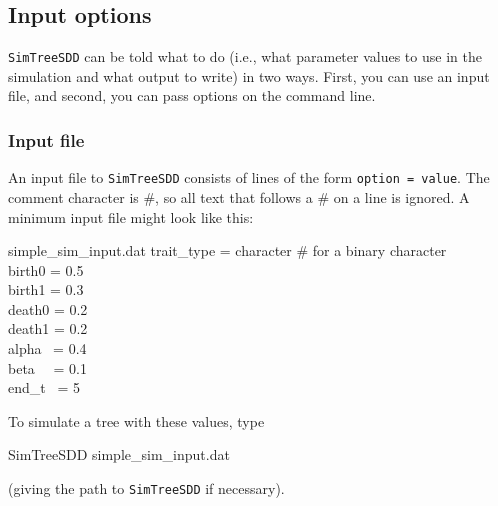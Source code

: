 \documentclass[10pt]{article}
\begin{document}
\subsection*{Input options}

\texttt{SimTreeSDD} can be told what to do (i.e., what parameter values to use in the simulation and what output to write) in two ways.
First, you can use an input file, and second, you can pass options on the command line.

\subsubsection*{Input file}

An input file to \texttt{SimTreeSDD} consists of lines of the form \texttt{option = value}.  The comment character is \#, so all text that follows a \# on a line is ignored.  A minimum input file might look like this:
\begin{filesays}{simple\_sim\_input.dat}
	trait\_type = character \# for a binary character \\
	birth0  = 0.5  \\
	birth1  = 0.3  \\
	death0  = 0.2  \\
	death1  = 0.2  \\
	alpha \  = 0.4  \\
	beta \ \  = 0.1  \\
	end\_t \ = 5 
\end{filesays}

To simulate a tree with these values, type
\begin{commandis}
	SimTreeSDD simple\_sim\_input.dat
\end{commandis}
(giving the path to \texttt{SimTreeSDD} if necessary).
\end{document}
